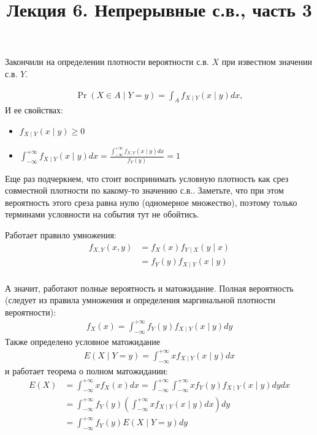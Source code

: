 \documentclass[12pt]{article}
\title{Лекция 6. Непрерывные с.в., часть 3}
\begin{document}
\maketitle


Закончили на определении плотности вероятности с.в. $X$ при известном значении с.в. $Y$.

\begin{align*}
  \Pr(X \in A \mid Y = y) = \int_A f_{X \mid Y}(x \mid y) dx,
\end{align*}
И ее свойствах:
\begin{itemize}
  \item $f_{X \mid Y}(x \mid y) \ge 0$
  \item $\int_{-\infty}^{+\infty} f_{X \mid Y}(x \mid y) dx = \frac{\int_{-\infty}^{+\infty} f_{X, Y}(x \mid y) dx}{f_Y(y)} = 1$
\end{itemize}

Еще раз подчеркнем, что стоит воспринимать условную плотность как срез совместной плотности по какому-то значению с.в.. Заметьте, что при этом вероятность этого среза равна нулю (одномерное множество), поэтому только терминами условности на события тут не обойтись.

Работает правило умножения:
\begin{align*}
  f_{X, Y} (x, y) &= f_X(x) f_{Y \mid X}(y \mid x) \\
                  &= f_Y(y) f_{X \mid Y}(x \mid y) \\
\end{align*}

А значит, работают полные вероятность и матожидание. Полная вероятность (следует из правила умножения и определения маргинальной плотности вероятности):
\begin{align*}
  f_X(x) = \int_{-\infty}^{+\infty} f_Y(y) f_{X \mid Y}(x\mid y) dy
\end{align*}
Также определено условное матожидание
\begin{align*}
  E(X \mid Y = y) = \int_{-\infty}^{+\infty} x f_{X \mid Y}(x \mid y) dx
\end{align*}
и работает теорема о полном матожидании:
\begin{align*}
  E(X) &= \int_{-\infty}^{+\infty} x f_{X}(x) dx = \int_{-\infty}^{+\infty} \int_{-\infty}^{+\infty} x f_Y(y) f_{X \mid Y}(x\mid y) dy dx \\
       &= \int_{-\infty}^{+\infty}  f_Y(y) \left(\int_{-\infty}^{+\infty} x f_{X \mid Y}(x\mid y) dx\right) dy \\
       &= \int_{-\infty}^{+\infty} f_{Y}(y)E(X \mid Y = y) dy
\end{align*}
\end{document}
